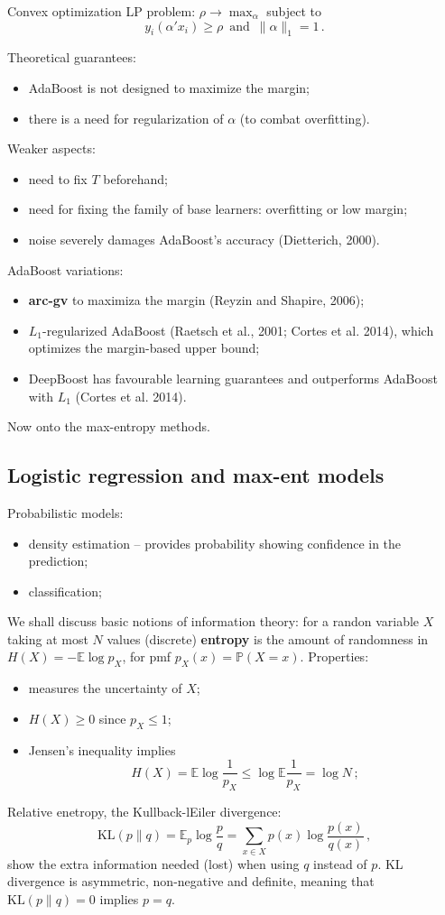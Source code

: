 \documentclass[a4paper]{article}
\newcommand{\ex}{\mathbb{E}}
\newcommand{\pr}{\mathbb{P}}
\begin{document}
Convex optimization LP problem: $\rho\to \max_\alpha$ subject to
\[ y_i (\alpha'x_i) \geq \rho\,\text{ and }\, \|\alpha\|_1 = 1\,. \]

Theoretical guarantees: \begin{itemize}
    \item AdaBoost is not designed to maximize the margin;
    \item there is a need for regularization of $\alpha$ (to combat overfitting).
\end{itemize}
Weaker aspects: \begin{itemize}
    \item need to fix $T$ beforehand;
    \item need for fixing the family of base learners: overfitting or low margin;
    \item noise severely damages AdaBoost's accuracy (Dietterich, 2000).
\end{itemize}
AdaBoost variations:\begin{itemize}
    \item \textbf{arc-gv} to maximiza the margin (Reyzin and Shapire, 2006);
    \item $L_1$-regularized AdaBoost (Raetsch et al., 2001; Cortes et al. 2014),
    which optimizes the margin-based upper bound;
    \item DeepBoost has favourable learning guarantees and outperforms AdaBoost
    with $L_1$ (Cortes et al. 2014).
\end{itemize}

Now onto the max-entropy methods.

\subsection{Logistic regression and max-ent models} %
\label{sub:logistic_regression_and_max_ent_models}

Probabilistic models: \begin{itemize}
    \item density estimation -- provides probability showing confidence in the prediction;
    \item classification;
\end{itemize}
We shall discuss basic notions of information theory: for a randon variable $X$ taking 
at most $N$ values (discrete) \textbf{entropy} is the amount
of randomness in $H(X) = -\ex \log p_X$, for pmf $p_X(x) = \pr(X=x)$. Properties:
\begin{itemize}
    \item measures the uncertainty of $X$;
    \item $H(X)\geq 0$ since $p_X \leq 1$;
    \item Jensen's inequality implies 
    \[ H(X) = \ex\log\frac{1}{p_X} \leq \log \ex \frac{1}{p_X} = \log N\,;\]
\end{itemize}
Relative enetropy, the Kullback-lEiler divergence:
\[\text{KL}(p\|q)
    = \ex_p\log\frac{p}{q}
    = \sum_{x\in X}p(x) \log\frac{p(x)}{q(x)}
    \,, \]
show the extra information needed (lost) when using $q$ instead of $p$. KL divergence
is asymmetric, non-negative and definite, meaning that $\text{KL}(p\|q) = 0$ implies
$p=q$.
\end{document}
